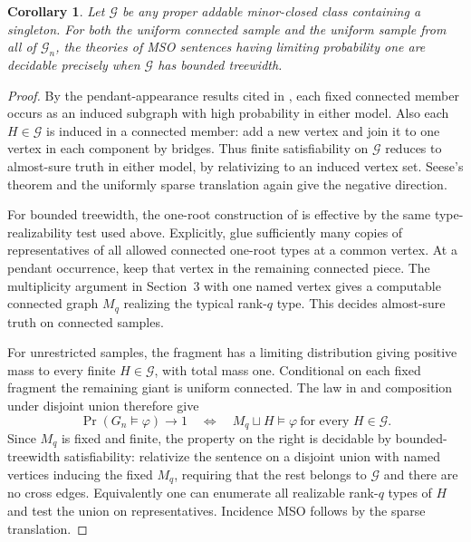 \documentclass[11pt]{article}
\newtheorem{corollary}[theorem]{Corollary}
\newcommand{\G}{\mathcal G}
\begin{document}
\begin{corollary}
Let $\G$ be any proper addable minor-closed class containing a singleton. For both the uniform connected sample and the uniform sample from all of $\G_n$, the theories of MSO sentences having limiting probability one are decidable precisely when $\G$ has bounded treewidth.
\end{corollary}
\begin{proof}
By the pendant-appearance results cited in \cite[\S2]{hmnt}, each fixed connected member occurs as an induced subgraph with high probability in either model. Also each $H\in\G$ is induced in a connected member: add a new vertex and join it to one vertex in each component by bridges. Thus finite satisfiability on $\G$ reduces to almost-sure truth in either model, by relativizing to an induced vertex set. Seese's theorem and the uniformly sparse translation again give the negative direction.

For bounded treewidth, the one-root construction of \cite[Theorem~3.1]{hmnt} is effective by the same type-realizability test used above. Explicitly, glue sufficiently many copies of representatives of all allowed connected one-root types at a common vertex. At a pendant occurrence, keep that vertex in the remaining connected piece. The multiplicity argument in Section~3 with one named vertex gives a computable connected graph $M_q$ realizing the typical rank-$q$ type. This decides almost-sure truth on connected samples.

For unrestricted samples, the fragment has a limiting distribution giving positive mass to every finite $H\in\G$, with total mass one. Conditional on each fixed fragment the remaining giant is uniform connected. The law in \cite[\S3]{hmnt} and composition under disjoint union therefore give
\[
 \Pr(G_n\models\varphi)\longrightarrow 1
 \quad\Longleftrightarrow\quad
 M_q\sqcup H\models\varphi\ \text{for every }H\in\G .
\]
Since $M_q$ is fixed and finite, the property on the right is decidable by bounded-treewidth satisfiability: relativize the sentence on a disjoint union with named vertices inducing the fixed $M_q$, requiring that the rest belongs to $\G$ and there are no cross edges. Equivalently one can enumerate all realizable rank-$q$ types of $H$ and test the union on representatives. Incidence MSO follows by the sparse translation.
\end{proof}
\end{document}
